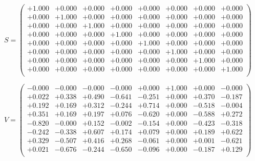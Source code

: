 \documentclass[9pt]{article}
\theoremstyle{plain}
\theoremstyle{definition}
\theoremstyle{remark}
\numberwithin{equation}{section}
\begin{document}
$S = \left(
\begin{array}{
cccccccc}
+1.000 & +0.000 & +0.000 & +0.000 & +0.000 & +0.000 & +0.000 & +0.000 \\
+0.000 & +1.000 & +0.000 & +0.000 & +0.000 & +0.000 & +0.000 & +0.000 \\
+0.000 & +0.000 & +1.000 & +0.000 & +0.000 & +0.000 & +0.000 & +0.000 \\
+0.000 & +0.000 & +0.000 & +1.000 & +0.000 & +0.000 & +0.000 & +0.000 \\
+0.000 & +0.000 & +0.000 & +0.000 & +1.000 & +0.000 & +0.000 & +0.000 \\
+0.000 & +0.000 & +0.000 & +0.000 & +0.000 & +1.000 & +0.000 & +0.000 \\
+0.000 & +0.000 & +0.000 & +0.000 & +0.000 & +0.000 & +1.000 & +0.000 \\
+0.000 & +0.000 & +0.000 & +0.000 & +0.000 & +0.000 & +0.000 & +1.000 \\
\end{array}
\right)$ \newline 

$V = \left(
\begin{array}{
cccccccc}
-0.000 & -0.000 & -0.000 & -0.000 & +0.000 & +1.000 & +0.000 & -0.000 \\
+0.022 & +0.338 & +0.490 & -0.641 & -0.251 & +0.000 & +0.370 & -0.187 \\
+0.192 & +0.169 & +0.312 & -0.244 & +0.714 & +0.000 & -0.518 & -0.004 \\
+0.351 & +0.169 & +0.197 & +0.076 & -0.620 & +0.000 & -0.588 & +0.272 \\
-0.820 & -0.000 & +0.152 & -0.002 & -0.154 & +0.000 & -0.423 & -0.318 \\
-0.242 & -0.338 & +0.607 & +0.174 & +0.079 & +0.000 & +0.189 & +0.622 \\
+0.329 & -0.507 & +0.416 & +0.268 & -0.061 & +0.000 & +0.001 & -0.621 \\
+0.021 & -0.676 & -0.244 & -0.650 & -0.096 & +0.000 & -0.187 & +0.129 \\
\end{array}
\right)$ \newline 
\end{document}
